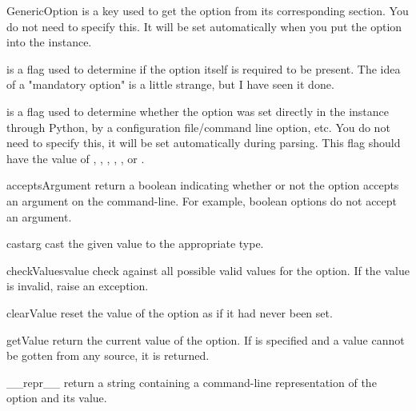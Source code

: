\begin{classdesc}{GenericOption}{
}
 is a key used to get the option from its corresponding section.
   You do not need to specify this.  It will be set automatically
   when you put the option into the  instance.

 is a flag used to determine if the option itself is
   required to be present.  The idea of a "mandatory option" is
   a little strange, but I have seen it done.

 is a flag used to determine whether the option was set
   directly in the  instance through Python,
   by a configuration file/command line option, etc.  You do not need
   to specify this, it will be set automatically during parsing.
   This flag should have the value of , ,
   , , , or .
\end{classdesc}

\begin{methoddesc}[GenericOption]{acceptsArgument}{}
return a boolean indicating whether or not the option accepts an argument on 
the command-line.  For example, boolean options do not accept an argument.
\end{methoddesc}

\begin{methoddesc}[GenericOption]{cast}{arg}
cast the given value to the appropriate type.
\end{methoddesc}

\begin{methoddesc}[GenericOption]{checkValues}{value}
check  against all possible valid values for the option.
If the value is invalid, raise an  exception.
\end{methoddesc}

\begin{methoddesc}[GenericOption]{clearValue}{}
reset the value of the option as if it had never been set.
\end{methoddesc}

\begin{methoddesc}[GenericOption]{getValue}{}
return the current value of the option.  If  is specified
and a value cannot be gotten from any source, it is returned.
\end{methoddesc}


\begin{methoddesc}[GenericOption]{__repr__}{}
return a string containing a command-line representation of the option and
its value.
\end{methoddesc}


